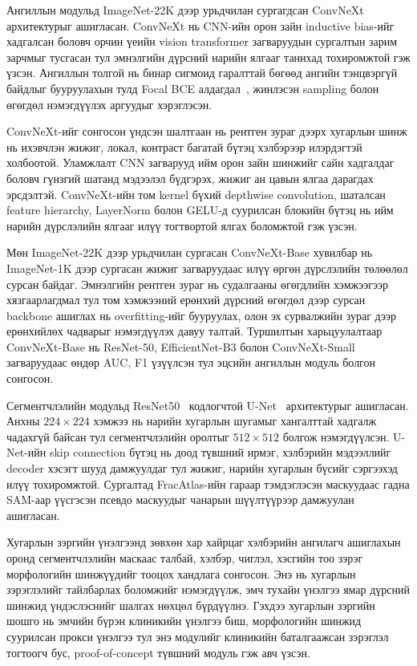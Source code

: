 Ангиллын модульд ImageNet-22K дээр урьдчилан сургагдсан ConvNeXt архитектурыг ашигласан. ConvNeXt нь CNN-ийн орон зайн inductive bias-ийг хадгалсан боловч орчин үеийн vision transformer загваруудын сургалтын зарим зарчмыг тусгасан тул эмнэлгийн дүрсний нарийн ялгааг танихад тохиромжтой гэж үзсэн. Ангиллын толгой нь бинар сигмоид гаралттай бөгөөд ангийн тэнцвэргүй байдлыг бууруулахын тулд Focal BCE алдагдал~\cite{ref44}, жинлэсэн sampling болон өгөгдөл нэмэгдүүлэх аргуудыг хэрэглэсэн.

ConvNeXt-ийг сонгосон үндсэн шалтгаан нь рентген зураг дээрх хугарлын шинж нь ихэвчлэн жижиг, локал, контраст багатай бүтэц хэлбэрээр илэрдэгтэй холбоотой. Уламжлалт CNN загварууд ийм орон зайн шинжийг сайн хадгалдаг боловч гүнзгий шатанд мэдээлэл бүдгэрэх, жижиг ан цавын ялгаа дарагдах эрсдэлтэй. ConvNeXt-ийн том kernel бүхий depthwise convolution, шаталсан feature hierarchy, LayerNorm болон GELU-д суурилсан блокийн бүтэц нь ийм нарийн дүрслэлийн ялгааг илүү тогтвортой ялгах боломжтой гэж үзсэн.

Мөн ImageNet-22K дээр урьдчилан сургасан ConvNeXt-Base хувилбар нь ImageNet-1K дээр сургасан жижиг загваруудаас илүү өргөн дүрслэлийн төлөөлөл сурсан байдаг. Эмнэлгийн рентген зураг нь судалгааны өгөгдлийн хэмжээгээр хязгаарлагдмал тул том хэмжээний ерөнхий дүрсний өгөгдөл дээр сурсан backbone ашиглах нь overfitting-ийг бууруулах, олон эх сурвалжийн зураг дээр ерөнхийлөх чадварыг нэмэгдүүлэх давуу талтай. Туршилтын харьцуулалтаар ConvNeXt-Base нь ResNet-50, EfficientNet-B3 болон ConvNeXt-Small загваруудаас өндөр AUC, F1 үзүүлсэн тул эцсийн ангиллын модуль болгон сонгосон.

Сегментчлэлийн модульд ResNet50~\cite{he2016resnet} кодлогчтой U-Net~\cite{ronneberger2015unet} архитектурыг ашигласан. Анхны $224\times224$ хэмжээ нь нарийн хугарлын шугамыг хангалттай хадгалж чадахгүй байсан тул сегментчлэлийн оролтыг $512\times512$ болгож нэмэгдүүлсэн. U-Net-ийн skip connection бүтэц нь доод түвшний ирмэг, хэлбэрийн мэдээллийг decoder хэсэгт шууд дамжуулдаг тул жижиг, нарийн хугарлын бүсийг сэргээхэд илүү тохиромжтой. Сургалтад FracAtlas-ийн гараар тэмдэглэсэн маскуудаас гадна SAM-аар үүсгэсэн псевдо маскуудыг чанарын шүүлтүүрээр дамжуулан ашигласан.

Хугарлын зэргийн үнэлгээнд зөвхөн хар хайрцаг хэлбэрийн ангилагч ашиглахын оронд сегментчлэлийн маскаас талбай, хэлбэр, чиглэл, хэсгийн тоо зэрэг морфологийн шинжүүдийг тооцох хандлага сонгосон. Энэ нь хугарлын зэрэглэлийг тайлбарлах боломжийг нэмэгдүүлж, эмч тухайн үнэлгээ ямар дүрсний шинжид үндэслэснийг шалгах нөхцөл бүрдүүлнэ. Гэхдээ хугарлын зэргийн шошго нь эмчийн бүрэн клиникийн үнэлгээ биш, морфологийн шинжид суурилсан прокси үнэлгээ тул энэ модулийг клиникийн баталгаажсан зэрэглэл тогтоогч бус, proof-of-concept түвшний модуль гэж авч үзсэн.

